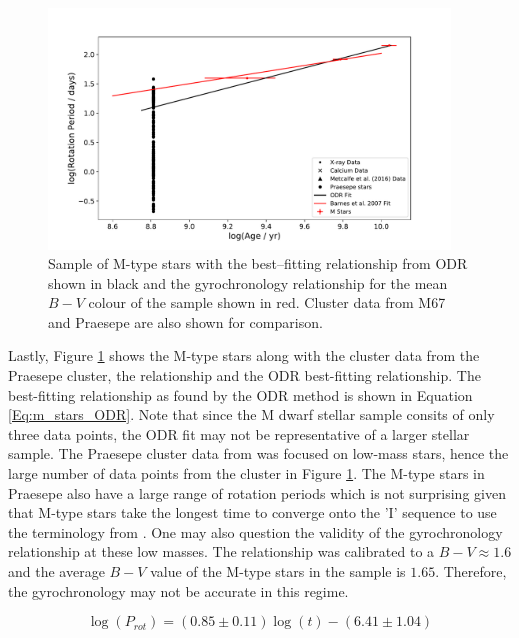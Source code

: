 \begin{figure}
    \centering
    \includegraphics[width=0.95\textwidth]{Figures/5-Activity_rotation/m_prot_v_age.pdf}
    \caption{Sample of M-type stars with the best--fitting relationship from ODR shown in black and the \citet{Barnes_2007} gyrochronology relationship for the mean $B-V$ colour of the sample shown in red. Cluster data from M67 and Praesepe are also shown for comparison.}
    \label{fig:m_prot_v_age}
\end{figure}

Lastly, Figure \ref{fig:m_prot_v_age} shows the M-type stars along with the cluster data from the Praesepe cluster, the \citet{Barnes_2007} relationship and the ODR best-fitting relationship. The best-fitting relationship as found by the ODR method is shown in Equation \ref{Eq:m_stars_ODR}. Note that since the M dwarf stellar sample consits of only three data points, the ODR fit may not be representative of a larger stellar sample. The Praesepe cluster data from \citet{Douglas_etal_2017} was focused on low-mass stars, hence the large number of data points from the cluster in Figure \ref{fig:m_prot_v_age}. The M-type stars in Praesepe also have a large range of rotation periods which is not surprising given that M-type stars take the longest time to converge onto the 'I' sequence to use the terminology from \citet{Barnes_2003}. One may also question the validity of the gyrochronology relationship at these low masses. The \citet{Barnes_2007} relationship was calibrated to a $B-V \approx 1.6$ and the average $B-V$ value of the M-type stars in the sample is $1.65$. Therefore, the gyrochronology may not be accurate in this regime.

\begin{equation}
    \log(P_{rot}) = (0.85 \pm 0.11)\log(t) - (6.41 \pm 1.04)
    \label{Eq:m_stars_ODR}
\end{equation}



